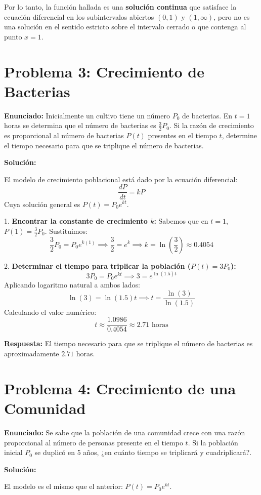 \documentclass[a4paper]{article}
\begin{document}
Por lo tanto, la función hallada es una \textbf{solución continua} que satisface la ecuación diferencial en los subintervalos abiertos $(0, 1)$ y $(1, \infty)$, pero no es una solución en el sentido estricto sobre el intervalo cerrado o que contenga al punto $x=1$.

\section{Problema 3: Crecimiento de Bacterias}

\textbf{Enunciado:} Inicialmente un cultivo tiene un número $P_0$ de bacterias. En $t = 1$ horas se determina que el número de bacterias es $\frac{3}{2} P_0$. Si la razón de crecimiento es proporcional al número de bacterias $P(t)$ presentes en el tiempo $t$, determine el tiempo necesario para que se triplique el número de bacterias.

\textbf{Solución:}

El modelo de crecimiento poblacional está dado por la ecuación diferencial:
$$\frac{dP}{dt} = kP$$
Cuya solución general es $P(t) = P_0 e^{kt}$.

1. \textbf{Encontrar la constante de crecimiento $k$:}
Sabemos que en $t = 1$, $P(1) = \frac{3}{2}P_0$. Sustituimos:
$$\frac{3}{2}P_0 = P_0 e^{k(1)} \implies \frac{3}{2} = e^k \implies k = \ln\left(\frac{3}{2}\right) \approx 0.4054$$

2. \textbf{Determinar el tiempo para triplicar la población ($P(t) = 3P_0$):}
$$3P_0 = P_0 e^{kt} \implies 3 = e^{\ln(1.5)t}$$
Aplicando logaritmo natural a ambos lados:
$$\ln(3) = \ln(1.5)t \implies t = \frac{\ln(3)}{\ln(1.5)}$$
Calculando el valor numérico:
$$t \approx \frac{1.0986}{0.4054} \approx 2.71 \text{ horas}$$

\textbf{Respuesta:} El tiempo necesario para que se triplique el número de bacterias es aproximadamente $2.71$ horas.

\section{Problema 4: Crecimiento de una Comunidad}

\textbf{Enunciado:} Se sabe que la población de una comunidad crece con una razón proporcional al número de personas presente en el tiempo $t$. Si la población inicial $P_0$ se duplicó en 5 años, ¿en cuánto tiempo se triplicará y cuadriplicará?.

\textbf{Solución:}

El modelo es el mismo que el anterior: $P(t) = P_0 e^{kt}$.
\end{document}
